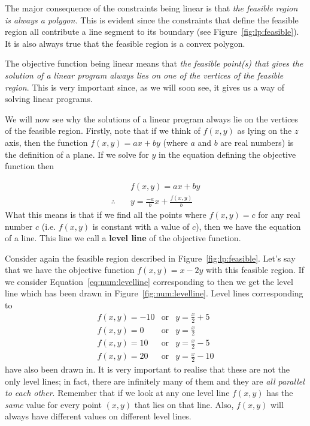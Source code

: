 The major consequence of the constraints being linear is that \textit{the feasible region is always a polygon.} This is evident since the constraints that define the feasible region all contribute a line segment to its boundary (see Figure~\ref{fig:lp:feasible}). It is also always true that the feasible region is a convex polygon.

The objective function being linear means that \textit{the feasible point(s) that gives the solution of a linear program always lies on one of the vertices of the feasible region}. This is very important since, as we will soon see, it gives us a way of solving linear programs. 

We will now see why the solutions of a linear program always lie on the vertices of the feasible region. Firstly, note that if we think of $f(x,y)$ as lying on the $z$ axis, then the function $f(x,y)=ax+by$ (where $a$ and $b$ are real numbers) is the definition of a plane. If we solve for $y$ in the equation defining the objective function then

\begin{align}\label{eq:num:levelline}
\nonumber & \quad f(x,y)=ax+by\\
\therefore & \quad y=\frac{-a}{b}x+\frac{f(x,y)}{b}
\end{align}
What this means is that if we find all the points where $f(x,y)=c$ for any real number $c$ (i.e. $f(x,y)$ is constant with a value of $c$), then we have the equation of a line. This line we call a \textbf{level line} of the objective function.

Consider again the feasible region described in Figure~\ref{fig:lp:feasible}. Let's say that we have the objective function $f(x,y)=x-2y$ with this feasible region. If we consider Equation~\ref{eq:num:levelline} corresponding to
then we get the level line
which has been drawn in Figure~\ref{fig:num:levelline}. Level lines corresponding to
\begin{eqnarray*}
f(x,y)=-10 &\text{or}&y=\frac{x}{2}+5\\
f(x,y)=0 &\text{or}& y=\frac{x}{2}\\
f(x,y)=10 &\text{or}& y=\frac{x}{2}-5\\
f(x,y)=20 &\text{or}& y=\frac{x}{2}-10
\end{eqnarray*}
have also been drawn in. It is very important to realise that these are not the only level lines; in fact, there are infinitely many of them and they are \textit{all parallel to each other}. Remember that if we look at any one level line $f(x,y)$ has the \textit{same} value for every point $(x,y)$ that lies on that line. Also, $f(x,y)$ will always have different values on different level lines.

